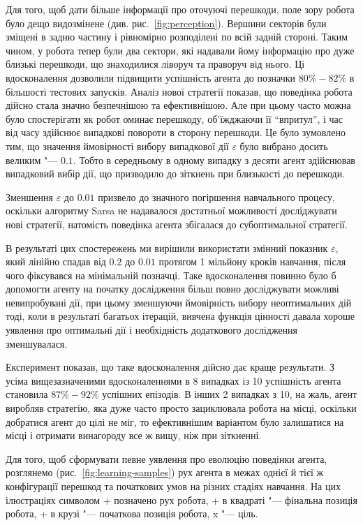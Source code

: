 \documentclass[a4paper,10pt,fleqn]{article}
\begin{document}
Для того, щоб дати більше інформації про оточуючі перешкоди, поле зору робота було дещо видозмінене (див. рис.~\ref{fig:perception}). Вершини секторів були зміщені в задню частину і рівномірно розподілені по всій задній стороні. Таким чином, у робота тепер були два сектори, які надавали йому інформацію про дуже близькі перешкоди, що знаходилися ліворуч та праворуч від нього. Ці вдосконалення дозволили підвищити успішність агента до позначки $80\%-82\%$ в більшості тестових запусків. Аналіз нової стратегії показав, що поведінка робота дійсно стала значно безпечнішою та ефективнішою. Але при цьому часто можна було спостерігати як робот оминає перешкоду, об'їжджаючи її ``впритул'', і час від часу здійснює випадкові повороти в сторону перешкоди. Це було зумовлено тим, що значення ймовірності вибору випадкової дії $\varepsilon$ було вибрано досить великим "--- $0.1$. Тобто в середньому в одному випадку з десяти агент здійснював випадковий вибір дії, що призводило до зіткнень при близькості до перешкоди.

Зменшення $\varepsilon$ до $0.01$ призвело до значного погіршення навчального процесу, оскільки алгоритму Sarsa не надавалося достатньої можливості досліджувати нові стратегії, натомість поведінка агента збігалася до субоптимальної стратегії.

В результаті цих спостережень ми вирішили використати змінний показник $\varepsilon$, який лінійно спадав від $0.2$ до $0.01$ протягом 1 мільйону кроків навчання, після чого фіксувався на мінімальній позначці. Таке вдосконалення повинно було б допомогти агенту на початку дослідження більш повно досліджувати можливі невипробувані дії, при цьому зменшуючи ймовірність вибору неоптимальних дій тоді, коли в результаті багатьох ітерацій, вивчена функція цінності давала хороше уявлення про оптимальні дії і необхідність додаткового дослідження зменшувалася.

Експеримент показав, що таке вдосконалення дійсно дає краще результати. З усіма вищезазначеними вдосконаленнями в 8 випадках із 10 успішність агента становила $87\%-92\%$ успішних епізодів. В інших 2 випадках з 10, на жаль, агент виробляв стратегію, яка дуже часто просто зациклювала робота на місці, оскільки добратися агент до цілі не міг, то ефективнішим варіантом було залишатися на місці і отримати винагороду все ж вищу, ніж при зіткненні.

Для того, щоб сформувати певне уявлення про еволюцію поведінки агента, розглянемо (рис.~\ref{fig:learning-samples}) рух агента в межах однієї й тієї ж конфігурації перешкод та початкових умов на різних стадіях навчання. На цих ілюстраціях символом + позначено рух робота, + в квадраті "--- фінальна позиція робота, + в крузі "--- початкова позиція робота, x "--- ціль.
\end{document}
